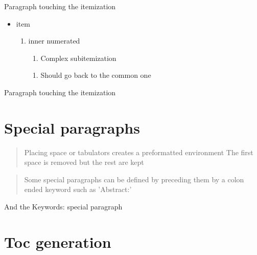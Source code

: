 Paragraph touching the itemization
\begin{itemize}
	\item  item
	\begin{enumerate}
		\item  inner numerated
		\begin{itemize}
			\begin{enumerate}
				\begin{itemize}
					\begin{enumerate}
						\item  Complex subitemization
					\end{enumerate}
				\end{itemize}
			\end{enumerate}
			\begin{itemize}
				\begin{itemize}
					\begin{enumerate}
						\item  Should go back to the common one
					\end{enumerate}
				\end{itemize}
			\end{itemize}
		\end{itemize}
	\end{enumerate}
\end{itemize}
Paragraph touching the itemization

\section{Special paragraphs}

\begin{quote}
Placing space or tabulators
creates a preformatted environment
	The first space is removed but the rest are kept
\end{quote}

\begin{abstract}
Some special paragraphs can be defined by preceding them by a
colon ended keyword such as 'Abstract:'
\end{abstract}

\begin{keywords}
And the Keywords: special paragraph
\end{keywords}

\section{Toc generation}

